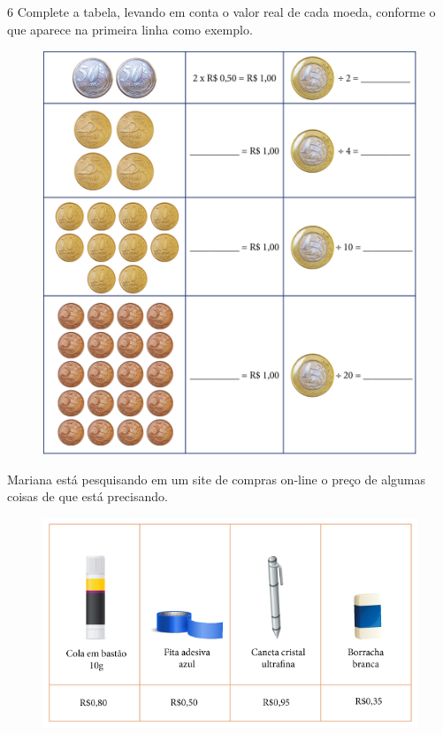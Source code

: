 

\pagebreak
\num{6} Complete a tabela, levando em conta o valor real de cada
moeda, conforme o que aparece na primeira linha como exemplo.

\begin{figure}[htpb!]
\centering
\includegraphics[width=\textwidth]{../ilustracoes/MAT5/SAEB_5ANO_MAT_figura53.png}
\end{figure}

\pagebreak

Mariana está pesquisando em um site de compras on-line o preço de
algumas coisas de que está precisando.

\begin{figure}[htpb!]
\includegraphics[width=\textwidth]{../ilustracoes/MAT5/SAEB_5ANO_MAT_figura54.png}
\end{figure}

